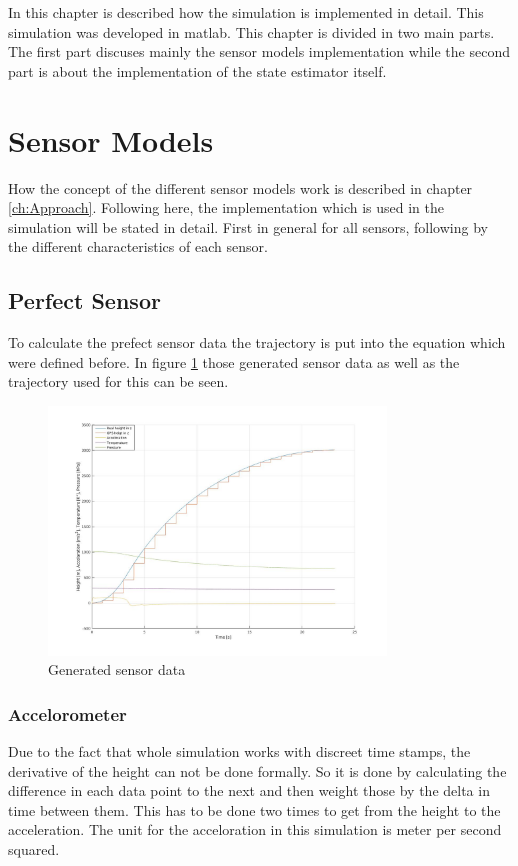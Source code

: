 In this chapter is described how the simulation is implemented in detail.
This simulation was developed in matlab.
This chapter is divided in two main parts.
The first part discuses mainly the sensor models implementation while the second part is about the implementation of the state estimator itself.

\section{Sensor Models}
How the concept of the different sensor models work is described in chapter \ref{ch:Approach}.
Following here, the implementation which is used in the simulation will be stated in detail.
First in general for all sensors, following by the different characteristics of each sensor.

\subsection{Perfect Sensor}
To calculate the prefect sensor data the trajectory is put into the equation which were defined before.
In figure \ref{fig:GeneratedPerfectSensor} those generated sensor data as well as the trajectory used for this can be seen.

\begin{figure}[h!]
 \centering
 \includegraphics[width=0.8\textwidth]{./Pictures/GeneratedSensorData.jpg}
 \caption{Generated sensor data}
 \label{fig:GeneratedPerfectSensor}
\end{figure}

\subsubsection{Accelorometer}
Due to the fact that whole simulation works with discreet time stamps, the derivative of the height can not be done formally.
So it is done by calculating the difference in each data point to the next and then weight those by the delta in time between them.
This has to be done two times to get from the height to the acceleration.
The unit for the acceloration in this simulation is meter per second squared.

